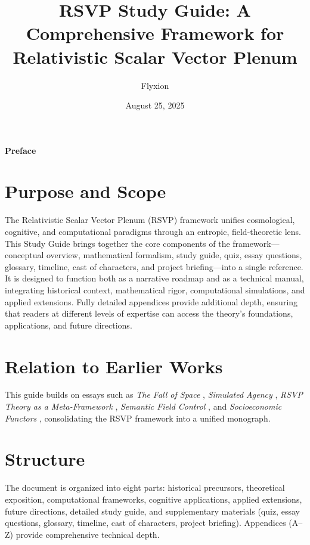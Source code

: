 \documentclass[12pt]{report}
\title{RSVP Study Guide: A Comprehensive Framework for Relativistic Scalar Vector Plenum}
\author{Flyxion}
\date{August 25, 2025}
\begin{document}
\maketitle
\tableofcontents

\begin{center}
    \textbf{Preface}
\end{center}

\section*{Purpose and Scope}
The Relativistic Scalar Vector Plenum (RSVP) framework unifies cosmological, cognitive, and computational paradigms through an entropic, field-theoretic lens. This Study Guide brings together the core components of the framework—conceptual overview, mathematical formalism, study guide, quiz, essay questions, glossary, timeline, cast of characters, and project briefing—into a single reference. It is designed to function both as a narrative roadmap and as a technical manual, integrating historical context, mathematical rigor, computational simulations, and applied extensions. Fully detailed appendices provide additional depth, ensuring that readers at different levels of expertise can access the theory’s foundations, applications, and future directions.

\section*{Relation to Earlier Works}
This guide builds on essays such as \textit{The Fall of Space} \citep{FallOfSpace2025}, \textit{Simulated Agency} \citep{SimulatedAgency2025}, \textit{RSVP Theory as a Meta-Framework} \citep{RSVPMeta2025}, \textit{Semantic Field Control} \citep{SemanticField2025}, and \textit{Socioeconomic Functors} \citep{SocioeconomicFunctors2025}, consolidating the RSVP framework into a unified monograph.

\section*{Structure}
The document is organized into eight parts: historical precursors, theoretical exposition, computational frameworks, cognitive applications, applied extensions, future directions, detailed study guide, and supplementary materials (quiz, essay questions, glossary, timeline, cast of characters, project briefing). Appendices (A--Z) provide comprehensive technical depth.
\end{document}
